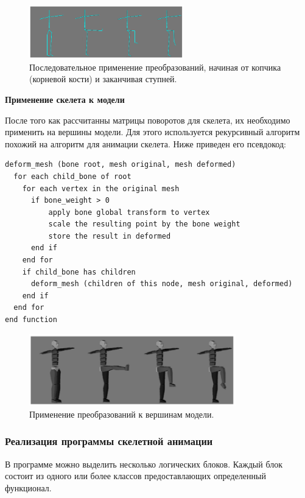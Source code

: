 \begin{figure}[h!]
    \centering
    \includegraphics[width=0.6\textwidth]{forward_kinematics_skeleton.png}
    \caption{\small{Последовательное применение преобразований, начиная от копчика (корневой кости) и заканчивая ступней.}}
\end{figure}


\textbf{Применение скелета к модели}

После того как рассчитанны матрицы поворотов для скелета, их необходимо применить на вершины модели.
Для этого используется рекурсивный алгоритм похожий на алгоритм для анимации скелета. Ниже приведен его псевдокод:

\begin{small}
\begin{verbatim}
deform_mesh (bone root, mesh original, mesh deformed)
  for each child_bone of root
    for each vertex in the original mesh
      if bone_weight > 0
          apply bone global transform to vertex
          scale the resulting point by the bone weight
          store the result in deformed
      end if
    end for
    if child_bone has children
      deform_mesh (children of this node, mesh original, deformed)
    end if
  end for
end function
\end{verbatim}
\end{small}

\begin{figure}[h!]
    \centering
    \includegraphics[width=0.8\textwidth]{forward_kinematics.png}
    \caption{\small{Применение преобразований к вершинам модели.}}

\end{figure}



\subsubsection{Реализация программы скелетной анимации}
В программе можно выделить несколько логических блоков. Каждый блок состоит из одного или более классов предоставлающих определенный функционал.

